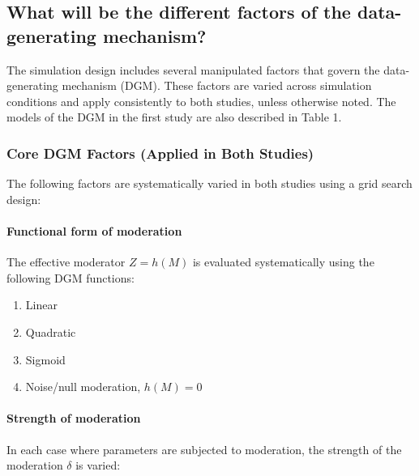 \documentclass[
  man,
  floatsintext]{apa7}
\providecommand{\tightlist}{%
  \setlength{\itemsep}{0pt}\setlength{\parskip}{0pt}}
\begin{document}
\pagebreak

\subsection{What will be the different factors of the data-generating
mechanism?}\label{what-will-be-the-different-factors-of-the-data-generating-mechanism}

The simulation design includes several manipulated factors that govern
the data-generating mechanism (DGM). These factors are varied across
simulation conditions and apply consistently to both studies, unless
otherwise noted. The models of the DGM in the first study are also
described in Table 1.

\subsubsection{Core DGM Factors (Applied in Both
Studies)}\label{core-dgm-factors-applied-in-both-studies}

The following factors are systematically varied in both studies using a
grid search design:

\paragraph{Functional form of
moderation}\label{functional-form-of-moderation}

The effective moderator \(Z = h(M)\) is evaluated systematically using
the following DGM functions:

\begin{enumerate}
\def\labelenumi{\arabic{enumi}.}
\tightlist
\item
  Linear\\
\item
  Quadratic\\
\item
  Sigmoid\\
\item
  Noise/null moderation, \(h(M)=0\)
\end{enumerate}

\paragraph{Strength of moderation}\label{strength-of-moderation}

In each case where parameters are subjected to moderation, the strength
of the moderation \(\delta\) is varied:
\end{document}
